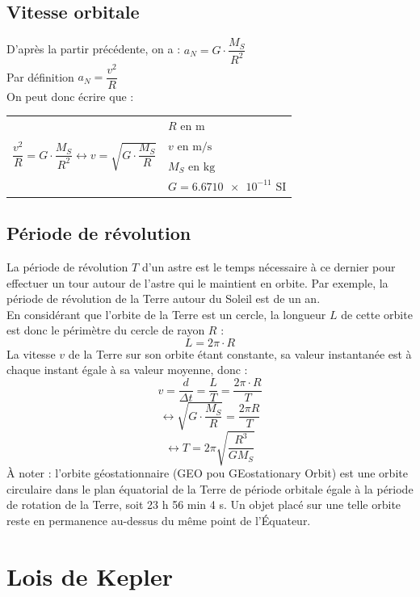 \documentclass[a4paper,12pt,fleqn]{scrartcl}%
\begin{document}
	\subsection{Vitesse orbitale}
	D'après la partir précédente, on a : $a_N = G \cdot \dfrac{M_S}{R^2}$\\
	Par définition $a_N = \dfrac{v^2}{R}$\\
	On peut donc écrire que :\\
	\begin{tabular}{m{8cm}|m{8cm}}
	\multirow{4}{8cm}{$\dfrac{v^2}{R}=G \cdot \dfrac{M_S}{R^2} \leftrightarrow v = \sqrt{G \cdot \dfrac{M_S}{R}}$}&$R \text{ en } \unit{\meter}$\\
	&$ v \text{ en } \unit{\meter \per \second}$\\
	&$M_S \text{ en } \unit{\kilo \gram}$\\
	&$G = \num{6,6710e-11} \text{ SI}$\\
	\end{tabular}
	\subsection{Période de révolution}
	La période de révolution $T$ d'un astre est le temps nécessaire à ce dernier pour effectuer un tour autour de l'astre qui le maintient en orbite. Par exemple, la période de révolution de la Terre autour du Soleil est de un an.\\ En considérant que l'orbite de la Terre est un cercle, la longueur $L$ de cette orbite est donc le périmètre du cercle de rayon $R$ :
	$$	L = 2 \pi \cdot R $$
	La vitesse $v$ de la Terre sur son orbite étant constante, sa valeur instantanée est à chaque instant égale à sa valeur moyenne, donc :
	$$v = \dfrac{d}{\Delta t} = \dfrac{L}{T} = \dfrac{2 \pi \cdot R}{T}$$
	$$\leftrightarrow \sqrt{G \cdot \dfrac{M_S}{R}} = \dfrac{2 \pi R}{T}$$
	$$\leftrightarrow T = 2 \pi \sqrt{\dfrac{R^3}{GM_S}}$$
	À noter : l'orbite géostationnaire (GEO pou GEostationary Orbit) est une orbite circulaire dans le plan équatorial de la Terre de période orbitale égale à la période de rotation de la Terre, soit \num{23} \unit{\hour} \num{56} \unit{\minute} \num{4} \unit{\second}. Un objet placé sur une telle orbite reste en permanence au-dessus du même point de l’Équateur.
\section{Lois de Kepler}
\end{document}
